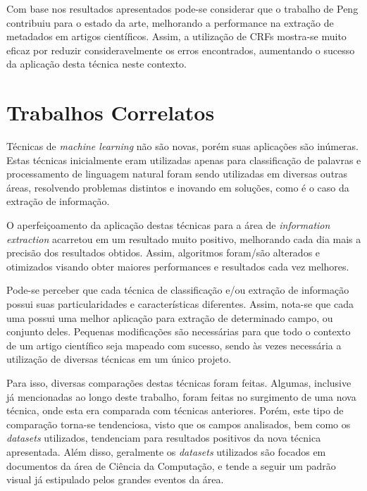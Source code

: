 Com base nos resultados apresentados pode-se considerar que o trabalho de Peng \cite{Peng-CRF-IE} contribuiu para o estado da arte, melhorando a performance na extração de metadados em artigos científicos. Assim, a utilização de CRFs mostra-se muito eficaz por reduzir consideravelmente os erros encontrados, aumentando o sucesso da aplicação desta técnica neste contexto.

\section{Trabalhos Correlatos}
\label{sec:revision}


Técnicas de \emph{machine learning} não são novas, porém suas aplicações são inúmeras. Estas técnicas inicialmente eram utilizadas apenas para classificação de palavras e processamento de linguagem natural foram sendo utilizadas em diversas outras áreas, resolvendo problemas distintos e inovando em soluções, como é o caso da extração de informação.

O aperfeiçoamento da aplicação destas técnicas para a área de \emph{information extraction} acarretou em um resultado muito positivo, melhorando cada dia mais a precisão dos resultados obtidos. Assim, algoritmos foram/são alterados e otimizados visando obter maiores performances e resultados cada vez melhores.

Pode-se perceber que cada técnica de classificação e/ou extração de informação possui suas particularidades e características diferentes. Assim, nota-se que cada uma possui uma melhor aplicação para extração de determinado campo, ou conjunto deles. Pequenas modificações são necessárias para que todo o contexto de um artigo científico seja mapeado com sucesso, sendo às vezes necessária a utilização de diversas técnicas em um único projeto.

Para isso, diversas comparações destas técnicas foram feitas. Algumas, inclusive já mencionadas ao longo deste trabalho, foram feitas no surgimento de uma nova técnica, onde esta era comparada com técnicas anteriores. Porém, este tipo de comparação torna-se tendenciosa, visto que os campos analisados, bem como os \emph{datasets} utilizados, tendenciam para resultados positivos da nova técnica apresentada. Além disso, geralmente os \emph{datasets} utilizados são focados em documentos da área de Ciência da Computação, e tende a seguir um padrão visual já estipulado pelos grandes eventos da área.

